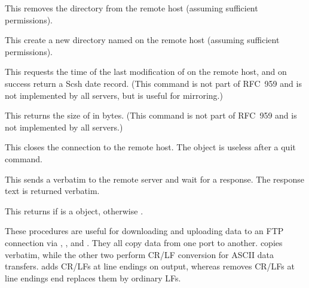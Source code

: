 \begin{desc}
  This removes the directory  from the remote host (assuming
  sufficient permissions).
\end{desc}

\begin{desc}
  This create a new directory named  on the remote host
  (assuming sufficient permissions).
\end{desc}

\begin{desc}
  This requests the time of the last modification of  on the
  remote host, and on success return a Scsh date record.  (This command
  is not part of RFC~959 and is not implemented by all servers, but is
  useful for mirroring.)
\end{desc}

\begin{desc}
  This returns the size of  in bytes. (This command is not
  part of RFC~959 and is not implemented by all servers.)
\end{desc}

\begin{desc}
  This closes the connection to the remote host.  The 
  object is useless after a quit command.
\end{desc}

\begin{desc}
  This sends a  verbatim to the remote server and wait
  for a response.  The response text is returned verbatim.
\end{desc}

\begin{desc}
  This returns \sharpt{} if  is a  object,
  otherwise \sharpf.
\end{desc}

\begin{desc}
  These procedures are useful for downloading and uploading data to an
  FTP connection via , , and .
  They all copy data from one port to another.
   copies verbatim, while the other two
  perform CR/LF conversion for ASCII data transfers.
   adds CR/LFs at line endings on output,
  whereas  removes CR/LFs at line endings
  end replaces them by ordinary LFs.
\end{desc}


